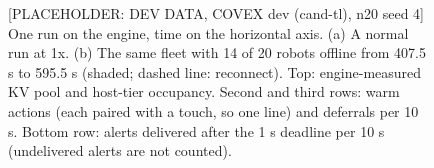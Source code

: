 \documentclass[sigconf]{acmart}
\begin{document}
{\selectfont
\begin{figure}[t]
  \centering
  
  \caption{[PLACEHOLDER: DEV DATA, COVEX dev (cand-tl), n20 seed 4] One run on the engine, time on the horizontal axis. (a) A normal run at 1x. (b) The same fleet with 14 of 20 robots offline from 407.5 s to 595.5 s (shaded; dashed line: reconnect). Top: engine-measured KV pool and host-tier occupancy. Second and third rows: warm actions (each paired with a touch, so one line) and deferrals per 10 s. Bottom row: alerts delivered after the 1 s deadline per 10 s (undelivered alerts are not counted).}
  \label{fig:F06_timeline}
\end{figure}
}


\end{document}
